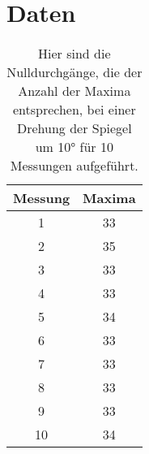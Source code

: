 \newpage
\section{Daten}
    \begin{table}[h]
        \centering
        \caption{Hier sind die Nulldurchgänge, die der Anzahl der Maxima entsprechen, bei einer Drehung der Spiegel um 10° für 10 Messungen aufgeführt.}
        \label{tab:Nullen_Glas}
        \begin{tabular}{c c}
        \toprule
        {Messung} & {Maxima}  \\
        \midrule
        1	 &  33  \\
        2	 &  35  \\
        3	 &  33  \\
        4	 &  33  \\
        5	 &  34  \\
        6	 &  33  \\
        7	 &  33  \\
        8	 &  33  \\
        9	 &  33  \\
        10	 &  34  \\
        
                      
        \bottomrule
        \end{tabular}
    \end{table}

    \FloatBarrier

